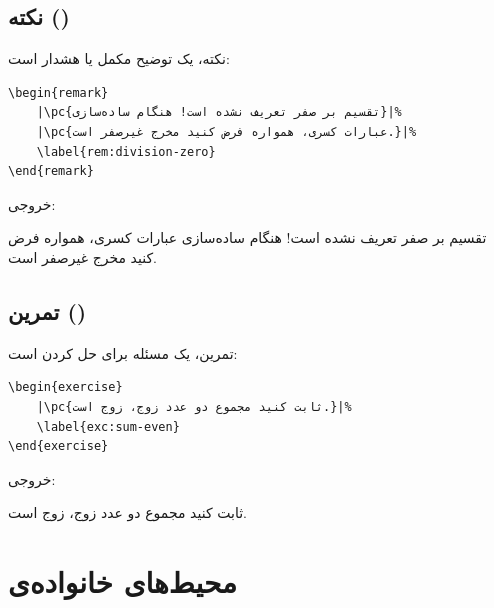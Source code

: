 \subsection{نکته ()}
\label{sec:environments-remark}

نکته، یک توضیح مکمل یا هشدار است:

\begin{latin}
\begin{verbatim}
\begin{remark}
    |\pc{تقسیم بر صفر تعریف نشده است! هنگام ساده‌سازی}|%
    |\pc{عبارات کسری، همواره فرض کنید مخرج غیرصفر است.}|%
    \label{rem:division-zero}
\end{remark}
\end{verbatim}
\end{latin}

خروجی:

\begin{remark}
    تقسیم بر صفر تعریف نشده است! هنگام ساده‌سازی
    عبارات کسری، همواره فرض کنید مخرج غیرصفر است.
    \label{rem:division-zero-ch8}
\end{remark}


\subsection{تمرین ()}
\label{sec:environments-exercise}

تمرین، یک مسئله برای حل کردن است:

\begin{latin}
\begin{verbatim}
\begin{exercise}
    |\pc{ثابت کنید مجموع دو عدد زوج، زوج است.}|%
    \label{exc:sum-even}
\end{exercise}
\end{verbatim}
\end{latin}

خروجی:

\begin{exercise}
    ثابت کنید مجموع دو عدد زوج، زوج است.
    \label{exc:sum-even-ch8}
\end{exercise}

\section{محیط‌های خانواده‌ی }
\label{sec:environments-outline-detail}

